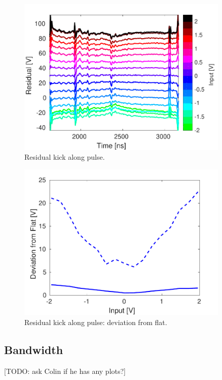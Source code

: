 \begin{figure}
  \centering
  \includegraphics[width=0.9\textwidth]{Figures/commissioning/residualKick_Traces}
  \caption{Residual kick along pulse.}
  \label{f:ampClosure}
\end{figure}

\begin{figure}
  \centering
  \includegraphics[width=0.9\textwidth]{Figures/commissioning/residualKick_Flatness}
  \caption{Residual kick along pulse: deviation from flat.}
  \label{f:ampClosureFlatness}
\end{figure}

\subsection{Bandwidth}
\label{ss:ampBand}

[TODO: ask Colin if he has any plots?]

